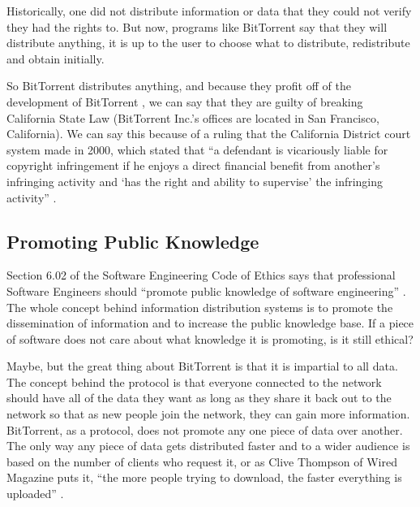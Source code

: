 \documentclass[11pt]{article}
\begin{document}
\begin{multicols}{2}
Historically, one did not distribute information or data that they could not verify they had the rights to. But now, programs like BitTorrent say that they will distribute anything, it is up to the user to choose what to distribute, redistribute and obtain initially.

So BitTorrent distributes anything, and because they profit off of the development of BitTorrent \cite{btbusiness}, we can say that they are guilty of breaking California State Law (BitTorrent Inc.'s offices are located in San Francisco, California). We can say this because of a ruling that the California District court system made in 2000, which stated that ``a defendant is vicariously liable for copyright infringement if he enjoys a direct financial benefit from another's infringing activity and `has the right and ability to supervise' the infringing activity'' \cite{2000m}.

\subsection{Promoting Public Knowledge}

Section 6.02 of the Software Engineering Code of Ethics says that professional Software Engineers should ``promote public knowledge of software engineering'' \cite[6.02]{secode}. The whole concept behind information distribution systems is to promote the dissemination of information and to increase the public knowledge base. If a piece of software does not care about what knowledge it is promoting, is it still ethical?

Maybe, but the great thing about BitTorrent is that it is impartial to all data. The concept behind the protocol is that everyone connected to the network should have all of the data they want as long as they share it back out to the network so that as new people join the network, they can gain more information. BitTorrent, as a protocol, does not promote any one piece of data over another. The only way any piece of data gets distributed faster and to a wider audience is based on the number of clients who request it, or as Clive Thompson of Wired Magazine puts it, ``the more people trying to download, the faster everything is uploaded'' \cite{wiredbt}.


\end{multicols}
\end{document}
